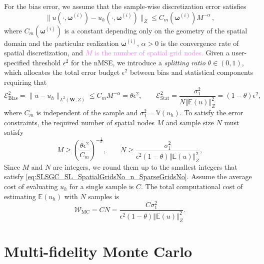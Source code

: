 \documentclass[final,3p,times,11pt]{elsarticle}
\newcommand{\JLcolor}[1]{{\textcolor{violet}{#1}}} %
\begin{document}
%
For the bias error, we assume that the sample-wise discretization error satisfies
%
\begin{equation*} \label{eq:Assumption_uhA}
\|u(\cdot, \boldsymbol\omega^{(i)})-u_h(\cdot,\boldsymbol\omega^{(i)})\|_Z\leq C_m(\boldsymbol\omega^{(i)})M^{-\alpha}\,,
\end{equation*}
%
where $C_m(\boldsymbol\omega^{(i)})$ is a constant depending only on the geometry of the spatial domain and the particular realization $\boldsymbol\omega^{(i)}$, $\alpha>0$ is the convergence rate of spatial discretization, and \JLcolor{$M$ is the number of spatial grid nodes.} Given a user-specified threshold $\epsilon^2$  for the nMSE, we introduce a {\it splitting ratio} $\theta \in (0,1)$, which allocates the total error budget $\epsilon^2$ between bias and statistical components requiring that
%
\begin{equation} \label{eq:error-budget}
\mathcal{E}_{\text{Bias}}^2=\|u-u_h\|_{L^2(\boldsymbol W,Z)}\le C_mM^{-\alpha}= \theta\epsilon^2, \quad\quad \mathcal{E}_{\text{Stat}}^2 = \frac{\sigma_1^2}{N\left\Vert\mathbb{E}(u) \right\Vert_{Z}^2}=(1-\theta)\epsilon^2,
\end{equation}
where $C_m$ is independent of the sample and $\sigma_1^2 = \mathbb{V}\left( u_{h}\right)$. To satisfy the error constraints,  the required number of spatial nodes $M$ and sample size $N$ must satisfy
%
\begin{equation}
\label{eq:SLSGC_SL_SpatialGridsNo_n_SparseGridsNo}
M\ge \left(\frac{\theta\epsilon^2}{C_m}\right)^{-\frac 1 {\alpha}},\quad\quad  N \ge  \frac{\sigma_1^2}{\epsilon^2(1-\theta)\left\Vert\mathbb{E}(u) \right\Vert_{Z}^2},
\end{equation}
%
Since $M$ and $N$ are integers, we round them up to the smallest integers that satisfy \eqref{eq:SLSGC_SL_SpatialGridsNo_n_SparseGridsNo}. Assume the average cost of evaluating $u_{h}$ for a single sample is $C$. The total computational cost of estimating $\mathbb{E}\left(u_h\right)$ with $N$ samples is
%
\[
\mathcal{W}_\text{MC}  = CN=\frac{C\sigma_1^2}{\epsilon^2(1-\theta)\left\Vert\mathbb{E}(u) \right\Vert_{Z}^2}.
\]
%

\section{Multi-fidelity Monte Carlo}\label{sec:MFMC}
\end{document}
